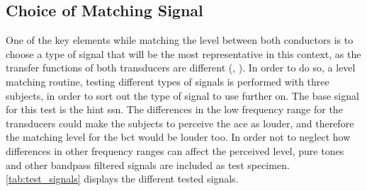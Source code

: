 \subsection{Choice of Matching Signal}
\label{sec:match_sig_cho}
One of the key elements while matching the level between both conductors is to choose a type of signal that will be the most representative in this context, as the transfer functions of both transducers are different (\citep{microPro_er4},  \citep{radioear_b81}). In order to do so, a level matching routine, testing different types of signals is performed with three subjects, in order to sort out the type of signal to use further on. The base signal for this test is the \matlab \gls{hint} \gls{ssn}. The differences in the low frequency range for the transducers could make the subjects to perceive the \gls{ace} as louder, and therefore the matching level for the \gls{bct} would be louder too. In order not to neglect how differences in other frequency ranges can affect the perceived level, pure tones and other bandpass filtered signals are included as test specimen. \autoref{tab:test_signals} displays the different tested signals.
